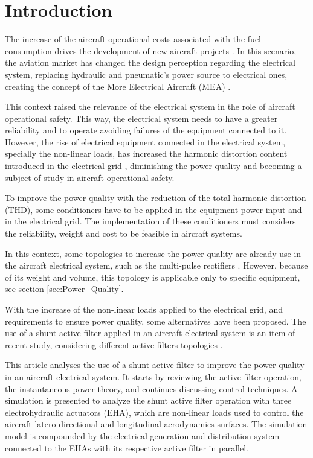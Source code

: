 \section{Introduction}

The increase of the aircraft operational costs associated with the fuel consumption drives the development of new aircraft projects \citep{Babikian2002}. In this scenario, the aviation market has changed the design perception regarding the electrical system, replacing hydraulic and pneumatic’s power source to electrical ones, creating the concept of the More Electrical Aircraft (MEA) \citep{Moir1999}.

This context raised the relevance of the electrical system in the role of aircraft operational safety. This way, the electrical system needs to have a greater reliability and to operate avoiding failures of the equipment connected to it. However, the rise of electrical equipment connected in the electrical system, specially the non-linear loads, has increased the harmonic distortion content introduced in the electrical grid \citep{Singer2012}, diminishing the power quality and becoming a subject of study in aircraft operational safety. 

To improve the power quality with the reduction of the total harmonic distortion (THD), some conditioners have to be applied in the equipment power input and in the electrical grid. The implementation of these conditioners must considers the reliability, weight and cost to be feasible in aircraft systems.

In this context, some topologies to increase the power quality are already use in the aircraft electrical system, such as the multi-pulse rectifiers \citep{Zhu2014,Gong2003,Lobo2005}. However, because of its weight and volume, this topology is applicable only to specific equipment, see section \ref{sec:Power_Quality}.

With the increase of the non-linear loads applied to the electrical grid, and requirements to ensure power quality, some alternatives have been proposed. The use of a shunt active filter applied in an aircraft electrical system is an item of recent study, considering different active filters topologies \citep{Chen2012research,Chen2012novel,Chen2012control}.

This article analyses the use of a shunt active filter to improve the power quality in an aircraft electrical system. It starts by reviewing the active filter operation, the instantaneous power theory, and continues discussing control techniques. A simulation is presented to analyze the shunt active filter operation with three electrohydraulic actuators (EHA), which are non-linear loads used to control the aircraft latero-directional and longitudinal aerodynamics surfaces. The simulation model is compounded by the electrical generation and distribution system connected to the EHAs with its respective active filter in parallel.

